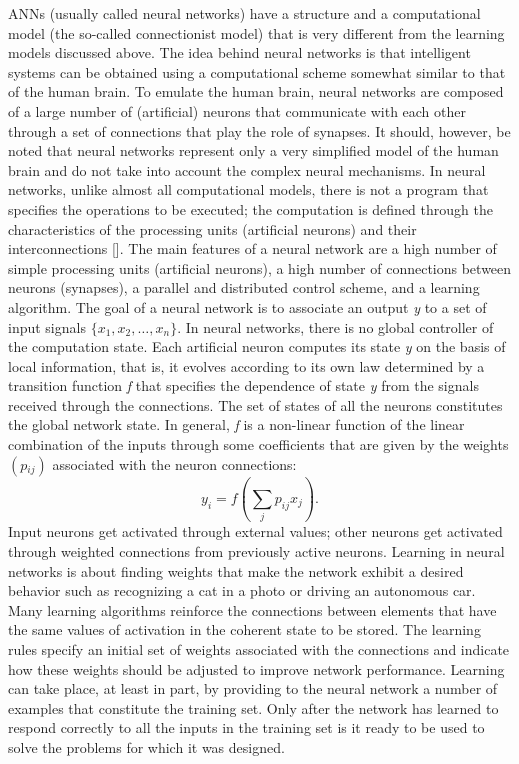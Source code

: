 ANNs (usually called neural networks) have a structure and a computational model (the so-called connectionist model) that is very different from the learning models discussed above. The idea behind neural networks is that intelligent systems can be obtained using a computational scheme somewhat similar to that of the human brain. To emulate the human brain, neural networks are composed of a large number of (artificial) neurons that communicate with each other through a set of connections that play the role of synapses. It should, however, be noted that neural networks represent only a very simplified model of the human brain and do not take into account the complex neural mechanisms. In neural networks, unlike almost all computational models, there is not a program that specifies the operations to be executed; the computation is defined through the characteristics of the processing units (artificial neurons) and their interconnections [\citealt{chap:4:FogelmanSoulie:1991}]. The main features of a neural network are a high number of simple processing units (artificial neurons), a high number of connections between neurons (synapses), a parallel and distributed control scheme, and a learning algorithm. The goal of a neural network is to associate an output \textit{y} to a set of input signals $\{x{}_{1}, x{}_{2}, \ldots, x_{n}\}$. In neural networks, there is no global controller of the computation state. Each artificial neuron computes its state \textit{y} on the basis of local information, that is, it evolves according to its own law determined by a transition function \textit{f} that specifies the dependence of state \textit{y} from the signals received through the connections. The set of states of all the neurons constitutes the global network state. In general, \textit{f} is a non-linear function of the linear combination of the inputs through some coefficients that are given by the weights $(p{}_{ij})$ associated with the neuron connections:
\begin{equation*}
y_{i} =f\left(\sum_{j}p_{ij} x_{j} \right).
\end{equation*}
Input neurons get activated through external values; other neurons get activated through weighted connections from previously active neurons. Learning in neural networks is about finding weights that make the network exhibit a desired behavior such as recognizing a cat in a photo or driving an autonomous car. Many learning algorithms reinforce the connections between elements that have the same values of activation in the coherent state to be stored. The learning rules specify an initial set of weights associated with the connections and indicate how these weights should be adjusted to improve network performance. Learning can take place, at least in part, by providing to the neural network a number of examples that constitute the training set. Only after the network has learned to respond correctly to all the inputs in the training set is it ready to be used to solve the problems for which it was designed.

